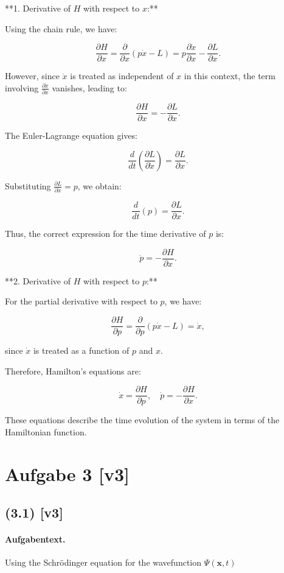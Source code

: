 \documentclass[11pt,a4paper]{article}
\begin{document}
**1. Derivative of \( H \) with respect to \( x \):**

Using the chain rule, we have:

$$
\frac{\partial H}{\partial x} = \frac{\partial}{\partial x} (p \dot{x} - L) = p \frac{\partial \dot{x}}{\partial x} - \frac{\partial L}{\partial x}.
$$

However, since \( \dot{x} \) is treated as independent of \( x \) in this context, the term involving \( \frac{\partial \dot{x}}{\partial x} \) vanishes, leading to:

$$
\frac{\partial H}{\partial x} = -\frac{\partial L}{\partial x}.
$$

The Euler-Lagrange equation gives:

$$
\frac{d}{dt} \left( \frac{\partial L}{\partial \dot{x}} \right) = \frac{\partial L}{\partial x}.
$$

Substituting \( \frac{\partial L}{\partial \dot{x}} = p \), we obtain:

$$
\frac{d}{dt}(p) = \frac{\partial L}{\partial x}.
$$

Thus, the correct expression for the time derivative of \( p \) is:

$$
\dot{p} = -\frac{\partial H}{\partial x}.
$$

**2. Derivative of \( H \) with respect to \( p \):**

For the partial derivative with respect to \( p \), we have:

$$
\frac{\partial H}{\partial p} = \frac{\partial}{\partial p} (p \dot{x} - L) = \dot{x},
$$

since \( \dot{x} \) is treated as a function of \( p \) and \( x \).

Therefore, Hamilton's equations are:

$$
\dot{x} = \frac{\partial H}{\partial p}, \quad \dot{p} = -\frac{\partial H}{\partial x}.
$$

These equations describe the time evolution of the system in terms of the Hamiltonian function.

\section*{Aufgabe 3 [v3]}
\subsection*{(3.1) [v3]}
\paragraph{Aufgabentext.}
Using the Schrödinger equation for the wavefunction $\Psi(\mathbf{x}, t)$
\end{document}
